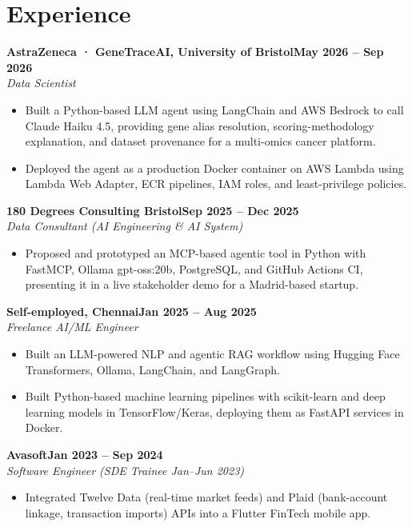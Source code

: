 \documentclass[a4paper,10pt]{article}
\newcommand{\entry}[4]{\noindent\textbf{#1}\hfill\textbf{#2}\\ \textit{#3}\hfill\textit{#4}\par}
\begin{document}
\section{Experience}
\entry{AstraZeneca · GeneTraceAI, University of Bristol}{May 2026 – Sep 2026}{Data Scientist}{}
\begin{itemize}
  \item Built a Python-based LLM agent using LangChain and AWS Bedrock to call Claude Haiku 4.5, providing gene alias resolution, scoring-methodology explanation, and dataset provenance for a multi-omics cancer platform.
  \item Deployed the agent as a production Docker container on AWS Lambda using Lambda Web Adapter, ECR pipelines, IAM roles, and least-privilege policies.
\end{itemize}
\vspace{3pt}
\entry{180 Degrees Consulting Bristol}{Sep 2025 – Dec 2025}{Data Consultant (AI Engineering \& AI System)}{}
\begin{itemize}
  \item Proposed and prototyped an MCP-based agentic tool in Python with FastMCP, Ollama gpt-oss:20b, PostgreSQL, and GitHub Actions CI, presenting it in a live stakeholder demo for a Madrid-based startup.
\end{itemize}
\vspace{3pt}
\entry{Self-employed, Chennai}{Jan 2025 – Aug 2025}{Freelance AI/ML Engineer}{}
\begin{itemize}
  \item Built an LLM-powered NLP and agentic RAG workflow using Hugging Face Transformers, Ollama, LangChain, and LangGraph.
  \item Built Python-based machine learning pipelines with scikit-learn and deep learning models in TensorFlow/Keras, deploying them as FastAPI services in Docker.
\end{itemize}
\vspace{3pt}
\entry{Avasoft}{Jan 2023 – Sep 2024}{Software Engineer (SDE Trainee Jan–Jun 2023)}{}
\begin{itemize}
  \item Integrated Twelve Data (real-time market feeds) and Plaid (bank-account linkage, transaction imports) APIs into a Flutter FinTech mobile app.
\end{itemize}

\end{document}
